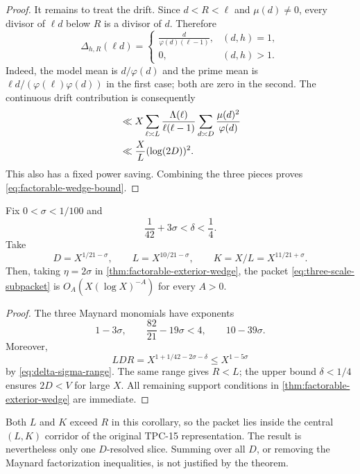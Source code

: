 \begin{proof}
It remains to treat the drift.  Since $d< R<\ell$ and $\mu(d)\ne0$, every
divisor of $\ell d$ below $R$ is a divisor of $d$.  Therefore
\begin{equation}
 \Delta_{h,R}(\ell d)=
 \begin{cases}
 \displaystyle\frac{d}{\varphi(d)(\ell-1)},&(d,h)=1,\\[0.8em]
 0,&(d,h)>1.
 \end{cases}
 \label{eq:simplified-wedge-drift}
\end{equation}
Indeed, the model mean is $d/\varphi(d)$ and the prime mean is
$\ell d/(\varphi(\ell)\varphi(d))$ in the first case; both are zero in
the second.  The continuous drift contribution is consequently
\begin{align}
 &\ll X
 \sum_{\ell\asymp L}
 \frac{\Lambda(\ell)}{\ell(\ell-1)}
 \sum_{d\asymp D}\frac{\mu(d)^2}{\varphi(d)}
 \notag\\
 &\ll \frac X L(\log(2D))^2.
 \label{eq:wedge-drift-total}
\end{align}
This also has a fixed power saving.  Combining the three pieces proves
\eqref{eq:factorable-wedge-bound}.
\end{proof}

\begin{corollary}
\label{cor:eleven-twenty-one-packet}
Fix $0<\sigma<1/100$ and
\begin{equation}
 \frac1{42}+3\sigma<\delta<\frac14.
 \label{eq:delta-sigma-range}
\end{equation}
Take
\begin{equation}
 D=X^{1/21-\sigma},
 \qquad
 L=X^{10/21-\sigma},
 \qquad
 K=X/L=X^{11/21+\sigma}.
 \label{eq:explicit-wedge-scales}
\end{equation}
Then, taking $\eta=2\sigma$ in
\cref{thm:factorable-exterior-wedge}, the packet
\eqref{eq:three-scale-subpacket} is
$O_A(X(\log X)^{-A})$ for every $A>0$.
\end{corollary}

\begin{proof}
The three Maynard monomials have exponents
\[
 1-3\sigma,
 \qquad \frac{82}{21}-19\sigma<4,
 \qquad 10-39\sigma.
\]
Moreover,
\[
 LDR=X^{1+1/42-2\sigma-\delta}
 \le X^{1-5\sigma}
\]
by \eqref{eq:delta-sigma-range}.  The same range gives $R<L$; the upper
bound $\delta<1/4$ ensures $2D<V$ for large $X$.  All remaining support
conditions in \cref{thm:factorable-exterior-wedge} are immediate.
\end{proof}

Both $L$ and $K$ exceed $R$ in this corollary, so the packet lies inside
the central $(L,K)$ corridor of the original TPC-15 representation.  The
result is nevertheless only one $D$-resolved slice.  Summing over all
$D$, or removing the Maynard factorization inequalities, is not justified
by the theorem.
